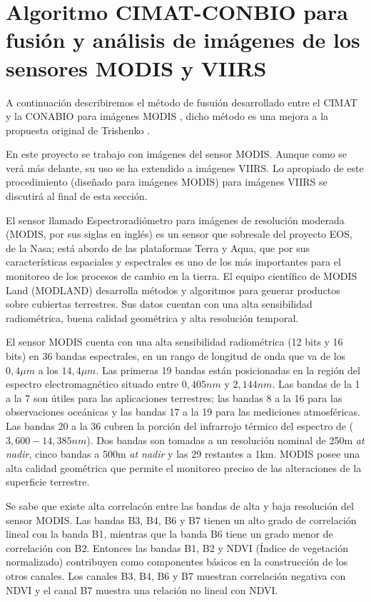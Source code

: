 
\section{Algoritmo CIMAT-CONBIO para fusión y análisis de imágenes de los sensores MODIS y VIIRS}

A continuación describiremos el método de fusuión desarrollado entre el CIMAT y la CONABIO para imágenes MODIS , dicho método es una mejora a la propuesta original de Trishenko .

En este proyecto se trabajo con imágenes del sensor MODIS. Aunque como se verá más delante, su uso se ha extendido a imágenes VIIRS. Lo apropiado de este procedimiento (diseñado para imágenes MODIS) para imágenes VIIRS se discutirá al final de esta sección. 

El sensor llamado Espectroradiómetro para imágenes de resolución moderada (MODIS, por sus siglas en inglés) es un sensor que sobresale del proyecto EOS, de la Nasa; está abordo de las plataformas Terra y Aqua, que por sus características espaciales y espectrales es uno de los más importantes para el monitoreo de los procesos de cambio en la tierra. El equipo científico de MODIS Land (MODLAND) desarrolla métodos y algoritmos para generar productos sobre cubiertas terrestres. Sus datos cuentan con una alta sensibilidad radiométrica, buena calidad geométrica y alta resolución temporal. 

El sensor MODIS cuenta con una alta sensibilidad radiométrica (12 bits y 16 bits) en 36 bandas espectrales, en un rango de longitud de onda que va de los $0,4 \mu m$ a los $14,4 \mu m$. Las primeras 19 bandas están posicionadas en la región del espectro electromagnético situado entre $0, 405 nm$ y $2, 144 nm$. Las bandas de la 1 a la 7 son útiles para las aplicaciones terrestres; las bandas 8 a la 16 para las observaciones oceánicas y las bandas 17 a la 19 para las mediciones atmosféricas. Las bandas 20 a la 36 cubren la porción del infrarrojo térmico del espectro de ($3, 600 -  14, 385 nm$). Dos bandas son tomadas a un resolución nominal de 250m \textit{at nadir}, cinco bandas a 500m \textit{at nadir} y las 29 restantes a 1km. MODIS posee una alta calidad geométrica que permite el monitoreo preciso de las alteraciones de la superficie terrestre. 

Se sabe que existe alta correlacón entre las bandas de alta y baja resolución del sensor MODIS. Las bandas B3, B4, B6 y B7 tienen un alto grado de correlación lineal con la banda B1, mientras que la banda B6 tiene un grado menor de correlación con B2. Entonces las bandas B1, B2 y NDVI (Índice de vegetación normalizado) contribuyen como componentes básicos en la construcción de los otros canales. Los canales B3, B4, B6 y B7 muestran correlación negativa con NDVI y el canal B7 muestra una relación no lineal con NDVI.

